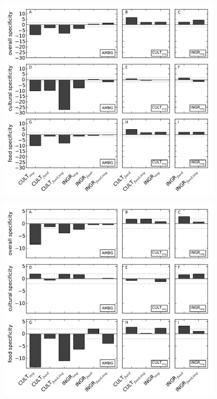 \documentclass[a4paper]{report}
\begin{document}
\begin{figure}
	\includegraphics[]{../specificity-test1.pdf}
\end{figure}

\begin{figure}
	\includegraphics[]{../specificity-test2.pdf}
\end{figure}
\end{document}
